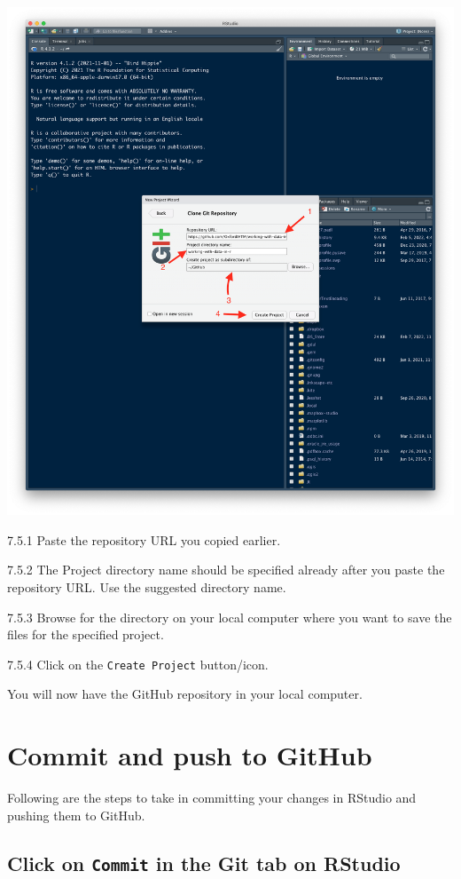 \documentclass[
  12pt,
]{book}
\begin{document}
\includegraphics{images/clone_step5.png}

7.5.1 Paste the repository URL you copied earlier.

7.5.2 The Project directory name should be specified already after you paste the repository URL. Use the suggested directory name.

7.5.3 Browse for the directory on your local computer where you want to save the files for the specified project.

7.5.4 Click on the \texttt{Create\ Project} button/icon.

You will now have the GitHub repository in your local computer.

\hypertarget{commit-and-push}{%
\chapter{Commit and push to GitHub}\label{commit-and-push}}

Following are the steps to take in committing your changes in RStudio and pushing them to GitHub.

\hypertarget{click-on-commit-in-the-git-tab-on-rstudio}{%
\section{\texorpdfstring{Click on \texttt{Commit} in the Git tab on RStudio}{Click on Commit in the Git tab on RStudio}}\label{click-on-commit-in-the-git-tab-on-rstudio}}
\end{document}
